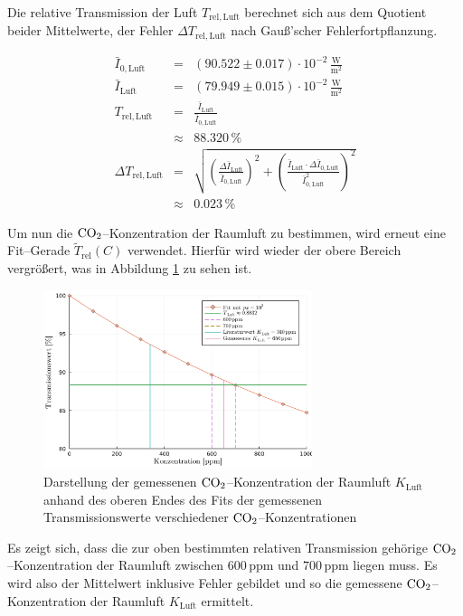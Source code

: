 \documentclass[12pt,a4paper]{scrartcl}
\numberwithin{equation}{section} %
\begin{document}
Die relative Transmission der Luft $T_\mathrm{rel, Luft}$ berechnet sich aus dem Quotient beider Mittelwerte, der Fehler $\Delta T_\mathrm{rel, Luft}$ nach Gauß'scher Fehlerfortpflanzung.

\begin{eqnarray}
	\bar{I}_{0, \mathrm{Luft}} &=& (90.522\pm 0.017) \cdot 10^{-2} \mathrm{\,\frac{W}{m^2}}\\
	\bar{I}_\mathrm{Luft} &=& (79.949 \pm 0.015) \cdot 10^{-2} \mathrm{\, \frac{W}{m^2}} \\
	T_\mathrm{rel, Luft} &=& \frac{\bar{I}_\mathrm{Luft}}{\bar{I}_{0, \mathrm{Luft}}} \\
		&\approx& 88.320 \mathrm{\, \%} \\
	\Delta T_\mathrm{rel, Luft} &=&
		\sqrt{
			\left(
				\frac{\Delta \bar{I}_\mathrm{Luft}}{\bar{I}_{0, \mathrm{Luft}}}
			\right)^2
			+ \left(
				\frac{\bar{I}_\mathrm{Luft} \cdot \Delta \bar{I}_{0, \mathrm{Luft}}}{\bar{I}_{0, \mathrm{Luft}}^2}
			\right)^2
		} \\
	&\approx& 0.023 \mathrm{\, \%}
\end{eqnarray}

\noindent
Um nun die $\ce{CO_2}$--Konzentration der Raumluft zu bestimmen, wird erneut eine Fit--Gerade $\tilde{T}_\mathrm{rel}(C)$ verwendet. Hierfür wird wieder der obere Bereich vergrößert, was in Abbildung \ref{fig:luftZoom} zu sehen ist.

\begin{figure}[h!]
	\centering
	\includegraphics[width=0.7\textwidth]{../media/B1.1/luftZoomPpm.pdf}
	\caption{Darstellung der gemessenen $\ce{CO_2}$--Konzentration der Raumluft $K_\mathrm{Luft}$ anhand des oberen Endes des Fits der gemessenen Transmissionswerte verschiedener $\ce{CO_2}$--Konzentrationen}
	\label{fig:luftZoom}
\end{figure}

Es zeigt sich, dass  die zur oben bestimmten relativen Transmission gehörige $\ce{CO_2}$--Konzentration der Raumluft zwischen $600 \mathrm{\, ppm}$ und $700 \mathrm{\, ppm}$ liegen muss. Es wird also der Mittelwert inklusive Fehler gebildet und so die gemessene $\ce{CO_2}$--Konzentration der Raumluft $K_\mathrm{Luft}$ ermittelt.
\end{document}
